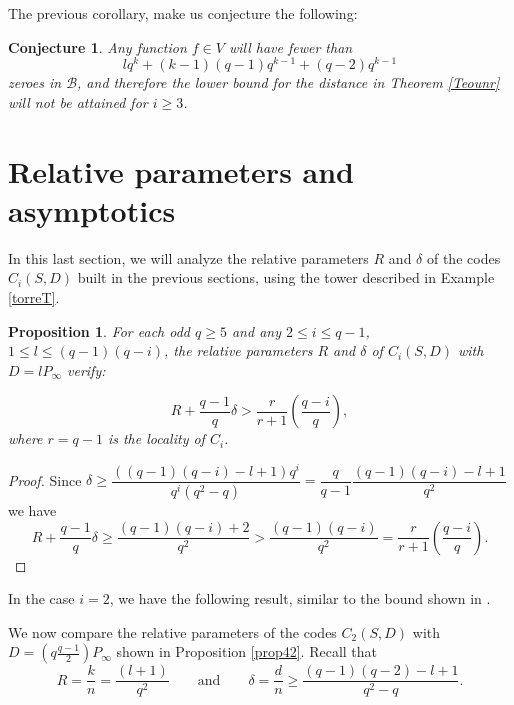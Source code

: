 \documentclass{amsart}
\newcommand{\m}{\mathcal}
\newtheorem{pro}[thm]{Proposition}
\newtheorem{conjecture}[thm]{Conjecture}
\theoremstyle{definition}
\begin{document}
The previous corollary, make us conjecture the following:

\begin{conjecture}
Any function $f \in  V$ will have fewer than $$lq^{k}+(k-1)(q-1)q^{k-1}+(q-2)q^{k-1}$$ zeroes in $\m{B}$, and therefore the lower bound for the distance in Theorem \ref{Teounr} will not be attained for $i \geq 3$.
\end{conjecture}


\section{Relative parameters and asymptotics}

	
In this last section, we will analyze the relative parameters $R$ and $\delta$ of the codes $C_i(S,D)$ built in the previous sections, using the tower described in Example \ref{torreT}.

%
	

\begin{pro}\label{propcotai} For each odd $q \geq 5$ and any $2 \leq i \leq q-1$, $1 \leq l\leq  (q-1)(q-i)$, the relative parameters $R$ and $\delta$ of $C_i(S,D)$ with $D = l P_{\infty}$ verify:
	
$$ R + \frac{q-1}{q} \delta > \frac{r}{r+1} \left( \frac{q-i}{q} \right),$$  where $r = q-1$ is the locality of $C_i$.
\end{pro}

\begin{proof}
	Since $\delta  \geq \dfrac{((q-1)(q-i) - l+1)q^i}{q^i(q^2-q)} = \dfrac{q}{q-1} \dfrac{(q-1)(q-i)-l+1}{q^2}$ we have $$R + \frac{q-1}{q} \delta \geq \frac{(q-1)(q-i)+2}{q^2} > \frac{(q-1)(q-i)}{q^2} = \frac{r}{r+1} \left( \frac{q-i}{q} \right).$$ 
\end{proof}

In the case $i = 2$, we have the following result, similar to the bound shown in \cite{LMX19}.

We now compare the relative parameters of the codes $C_2(S,D)$ with $D = \left(q\frac{q-1}{2} \right) P_{\infty}$ shown in  Proposition \ref{prop42}.
Recall that	$$R=\frac{k}{n}= \frac{(l+1)}{q^2}  \qquad \text{and} \qquad \delta =\frac{d}{n} \geq \frac{(q-1)(q-2)-l+1}{q^2-q} .$$
\end{document}
